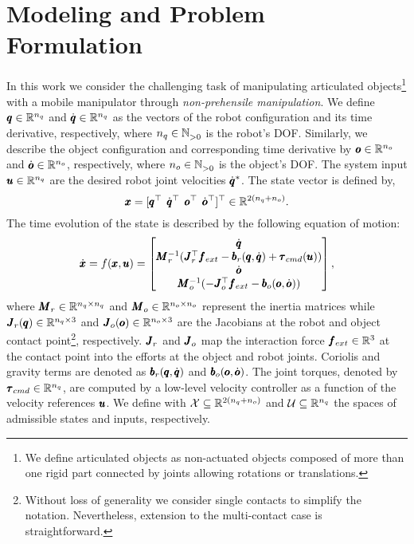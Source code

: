\section{Modeling and Problem Formulation} \label{sec:formulation}

In this work we consider the challenging task of manipulating articulated objects\footnote{We define articulated objects as non-actuated objects composed of more than one rigid part connected by joints allowing rotations or translations.} with a mobile manipulator through \textit{non-prehensile manipulation}. We define $\pmb{q} \in \mathbb{R}^{n_q}$ and $\dot{\pmb{q}} \in \mathbb{R}^{n_q}$ as the vectors of the robot configuration and its time derivative, respectively, where $n_q \in \mathbb{N}^{}_{>0}$ is the robot's DOF.
Similarly, we describe the object configuration and corresponding time derivative by $\pmb{o} \in \mathbb{R}^{n_o}$ and $\dot{\pmb{o}} \in \mathbb{R}^{n_o}$, respectively, where $n_o \in \mathbb{N}^{}_{>0}$ is the object's DOF. The system input $\pmb{u}  \in \mathbb{R}^{n_q}$ are the desired robot joint velocities $\dot{\pmb{q}}^*$. The state vector is defined by,
\begin{equation}
    \pmb{x} = [\pmb{q}^\top \;\, 
      \dot{\pmb{q}}^\top \;\, 
      \pmb{o}^\top \;\,
      \dot{\pmb{o}}^\top ]^\top  \in \mathbb{R}^{2(n_q + n_o)}.
\end{equation}
The time evolution of the state is described by the following equation of motion:
\begin{equation} \label{eq:eom}
    \dot{\pmb{x}} = f(\pmb{x}, \pmb{u}) =  
    \begin{bmatrix}
      \dot{\pmb{q}} \\
      \pmb{M}_r^{-1}(\pmb{J}_{r}^\top \pmb{f}_{ext} - \pmb{b}_{r}(\pmb{q}, \dot{\pmb{q}}) + \pmb{\tau}_{cmd}(\pmb{u})) \\
      \dot{\pmb{o}} \\
      \pmb{M}_o^{-1}(-\pmb{J}_{o}^\top \pmb{f}_{ext} - \pmb{b}_{o}(\pmb{o}, \dot{\pmb{o}}))
    \end{bmatrix},
\end{equation}
where $\pmb{M}_r \in \mathbb{R}^{n_q \times n_q}$ and $\pmb{M}_o \in \mathbb{R}^{n_o \times n_o}$ represent the inertia matrices while $\pmb{J}_r(\pmb{q}) \in \mathbb{R}^{n_q \times 3}$ and $\pmb{J}_o(\pmb{o}) \in \mathbb{R}^{n_o \times 3}$ are the Jacobians at the robot and object contact point\footnote{Without loss of generality we consider single contacts to simplify the notation. Nevertheless, extension to the multi-contact case is straightforward.}, respectively.
$\pmb{J}_r$ and $\pmb{J}_o$ map the interaction force $\pmb{f}_{ext} \in \mathbb{R}^{3}$ at the contact point into the efforts at the object and robot joints. Coriolis and gravity terms are denoted as $\pmb{b}_{r}(\pmb{q}, \dot{\pmb{q}})$ and $\pmb{b}_{o}(\pmb{o}, \dot{\pmb{o}})$. 
The joint torques, denoted by $\pmb{\tau}_{cmd}  \in \mathbb{R}^{n_q}$, are computed by a low-level velocity controller as a function of the velocity references $\pmb{u}$. We define with  $\mathcal{X} \subseteq \mathbb{R}^{2(n_q + n_o)}$ and $\mathcal{U} \subseteq \mathbb{R}^{n_q}$ the spaces of admissible states and inputs, respectively. 

